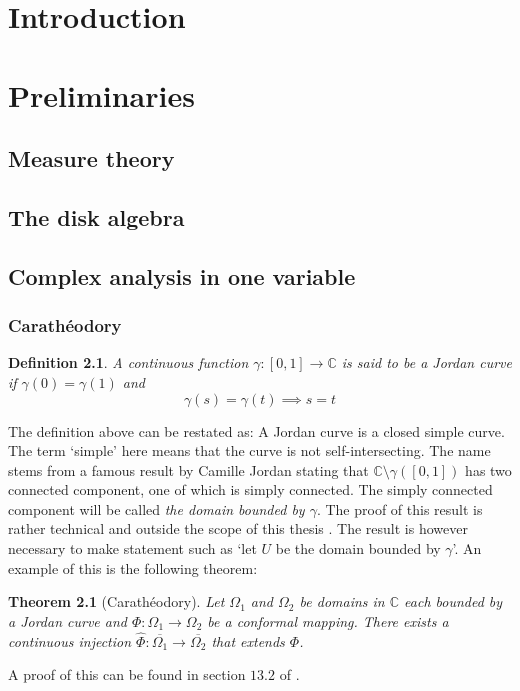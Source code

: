 \documentclass[a4paper,12pt,twoside,BCOR=10mm]{scrbook}
\newtheorem{theorem}{Theorem}
\newtheorem{definition}{Definition}
\begin{document}
\setcounter{page}{1}
\chapter{Introduction}


\chapter{Preliminaries}
\section{Measure theory}
\section{The disk algebra}
\section{Complex analysis in one variable}
\subsection{Carathéodory}
\begin{definition}
A continuous function $\gamma: [0, 1] \rightarrow \mathbb{C}$ is said to be a \emph{Jordan curve} if $\gamma(0) = \gamma(1)$ and
\[
	\gamma(s) = \gamma(t) \implies s = t \tag*{for all $s, t \in ]0, 1[$.}
\]
\end{definition}
The definition above can be restated as: A Jordan curve is a closed simple curve.
The term `simple' here means that the curve is not self-intersecting.
The name stems from a famous result by Camille Jordan stating that $\mathbb{C} \setminus \gamma([0, 1])$ has two connected component, one of which is simply connected.
The simply connected component will be called \emph{the domain bounded by $\gamma$}.
The proof of this result is rather technical and outside the scope of this thesis \cite{fdsa}\cite{fdas}. %
The result is however necessary to make statement such as `let $U$ be the domain bounded by $\gamma$'.
An example of this is the following theorem:
\begin{theorem}[Carathéodory]
Let $\Omega_1$ and $\Omega_2$ be domains in $\mathbb{C}$ each bounded by a Jordan curve and $\Phi: \Omega_1 \rightarrow \Omega_2$ be a conformal mapping.
There exists a continuous injection $\hat{\Phi}: \overline{\Omega_1} \rightarrow \overline{\Omega_2}$ that extends $\Phi$.
\end{theorem}
A proof of this can be found in section $13.2$ of \cite{green and krantz}. %
\end{document}
